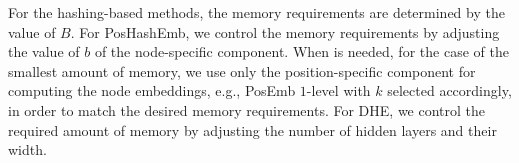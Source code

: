 \documentclass[conference]{IEEEtran}
\renewcommand{\arraystretch}{1.2}
\begin{document}
For the hashing-based methods, the memory requirements are determined by the value of $B$. For PosHashEmb, we control the memory requirements by adjusting the value of $b$ of the node-specific component. When is needed, for the case of the smallest amount of memory, we use only the position-specific component for computing the node embeddings, e.g., PosEmb $1$-level with $k$ selected accordingly, in order to match the desired memory requirements. For DHE, we control the required amount of memory by adjusting the number of hidden layers and their width.
% 
\renewcommand{\arraystretch}{0.7}
\end{document}
